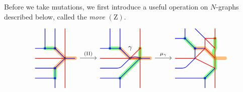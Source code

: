 Before we take mutations, we first introduce a useful operation on $N$-graphs 
described below, called the \emph{move} $\mathrm{(Z)}$.
\[
\begin{tikzcd}
\begin{tikzpicture}[baseline=-.5ex,scale=0.5]
\draw[cyclecolor2, line cap=round, line width=5, opacity=0.5] (-2,1)--(-1,1) (-1,-1)--(-1,-2);
\draw[cyclecolor1, line cap=round, line width=5, opacity=0.5,] (-1,1)--(0,0) (-1,-1)--(0,0) (0,0)--(1,0);
\draw[red, thick] (0,3) -- (0,-3) (0,0) -- (-3,0);
\draw[blue,thick, fill] (0,0) -- (-1,1) circle (2pt) -- +(0,2) (-1,1) -- ++(-1,0) circle (2pt) -- +(-1,0) (-2,1) -- +(0,2);
\draw[blue,thick, fill] (0,0) -- (-1,-1) circle (2pt) -- +(-2,0) (-1,-1) -- ++(0,-1) circle (2pt) -- +(0,-1) (-1,-2) -- +(-2,0);
\draw[blue,thick] (0,0) -- (1,0);
\draw[thick, fill=white] (0,0) circle (2pt);
\end{tikzpicture}\arrow[r,"\mathrm{(II)}"]&
\begin{tikzpicture}[baseline=-.5ex,scale=0.5]
\draw[cyclecolor2, line cap=round, line width=5, opacity=0.5] (-2,1)--(-1,1) (-1,-2)--(1,0)--(1,1);
\draw[cyclecolor1, line cap=round, line width=5, opacity=0.5] (-1,1)--(0,0) (0,0)--(2,0);
\draw[red, thick, fill] (1,3) -- (1,1) circle (2pt) -- (0,0) (1,1) -- (1,0) (1,0) -- (1,-3) (1,0) -- (-3,0);
\node at (-0.5,0.5)[above right] {$\gamma$};
\draw[blue, thick] (0,0) to[out=30,in=150] (1,0);
\draw[blue,thick, fill] (0,0) -- (-1,1) circle (2pt) -- +(0,2) (-1,1) -- ++(-1,0) circle (2pt) -- +(-1,0) (-2,1) -- +(0,2) (-1,-2) circle (2pt);
\draw[blue,thick]  (-1,-3) -- (-1,-2) -- (1,0) (-1,-2) -- (-3,-2);
\draw[blue,thick,rounded corners](0,0) -- (-1,-1) -- +(-2,0);
\draw[blue,thick] (1,0) -- (2,0);
\draw[thick, fill=white] (0,0) circle (2pt) (1,0) circle (2pt);
\end{tikzpicture}\arrow[r,"\mu_\gamma"]&
\begin{tikzpicture}[baseline=-.5ex,scale=0.5]
\draw[cyclecolor2, line cap=round, line width=5, opacity=0.5] (-2,2)--(-1,1) (0,-2)--(1,-1)--(1,0) to[out=120,in=-120] (1,1) -- (1,2);
\draw[cyclecolor1, line cap=round, line width=5, opacity=0.5,] (-1,1)--(0,1)--(1,0)--(2,0);
\draw[red, thick, fill] (1,3) -- (1,-3) (-3,0) -- (-1,0) (1,2) circle (2pt) -- (0,2);
\draw[red, thick] (1,1) -- (0,2) -- (0,1) -- (1,0) (0,1) -- (-1,0) -- (1,-1);
\draw[blue, thick, fill] (0,2) -- (-1,3) (0,1) -- (-1,1) circle (2pt) -- (-2,2) circle (2pt) -- (-2,3) (-1,1) -- (-1,0) (-2,2) -- (-3,2) (1,-1) -- (0,-2) circle (2pt) -- (-3,-2) (0,-2) -- (0,-3);
\draw[blue,thick, rounded corners] (-1,0) -- (-2,-1) -- (-3,-1) ;

\end{tikzpicture}
\end{tikzcd}\]
